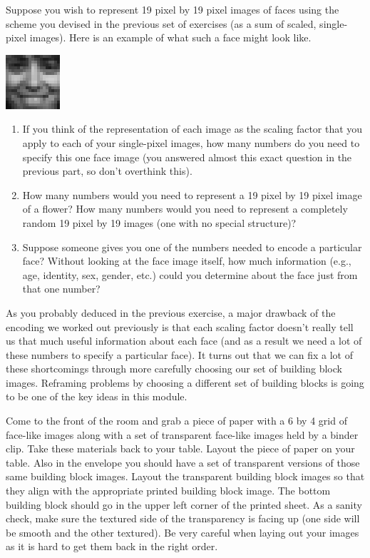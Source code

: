 \begin{prob}
Suppose you wish to represent 19 pixel by 19 pixel images of faces using the scheme you devised in the previous set of exercises (as a sum of scaled, single-pixel images).  Here is an example of what such a face might look like.
\begin{center}
\includegraphics[width=0.2\linewidth]{FacesDay1/figs/face0400}
\end{center}

\begin{enumerate}
\item If you think of the representation of each image as the scaling factor that you apply to each of your single-pixel images, how many numbers do you need to specify this one face image (you answered almost this exact question in the previous part, so don't overthink this).
\item How many numbers would you need to represent a 19 pixel by 19 pixel image of a flower?  How many numbers would you need to represent a completely random 19 pixel by 19 images (one with no special structure)?
\item Suppose someone gives you one of the numbers needed to encode a particular face?  Without looking at the face image itself, how much information (e.g., age, identity, sex, gender, etc.) could you determine about the face just from that one number?
\end{enumerate}
\end{prob}

As you probably deduced in the previous exercise, a major drawback of the encoding we worked out previously is that each scaling factor doesn't really tell us that much useful information about each face (and as a result we need a lot of these numbers to specify a particular face).  It turns out that we can fix a lot of these shortcomings through more carefully choosing our set of building block images.  Reframing problems by choosing a different set of building blocks is going to be one of the key ideas in this module.

Come to the front of the room and grab a piece of paper with a 6 by 4 grid of face-like images along with a set of transparent face-like images held by a binder clip.  Take these materials back to your table.  Layout the piece of paper on your table.  Also in the envelope you should have a set of transparent versions of those same building block images.  Layout the transparent building block images so that they align with the appropriate printed building block image.  The bottom building block should go in the upper left corner of the printed sheet.  As a sanity check, make sure the textured side of the transparency is facing up (one side will be smooth and the other textured).  Be very careful when laying out your images as it is hard to get them back in the right order.

